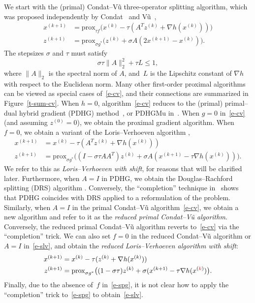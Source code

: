 \documentclass[letterpaper,11pt]{article}
\newcommand{\prox}{\mathrm{prox}}
\newcommand{\red}[1]{{\color{red}{#1}}}
\begin{document}
We start with the (primal) Condat--V\~u three-operator splitting 
algorithm, which was proposed independently
by Condat~\cite{Con:13} and V\~u~\cite{Vu:13},
\begin{subequations} \label{e-cv}
\begin{align}
  x^{(k+1)} &= \prox_{\tau f}
    \big(x^{(k)}-\tau (A^Tz^{(k)}+\nabla h(x^{(k)})) \big) \\
  z^{(k+1)} &= \prox_{\sigma g^\ast}
    \big(z^{(k)}+\sigma A(2x^{(k+1)}-x^{(k)}) \big).
\end{align}
\end{subequations}
The stepsizes $\sigma$ and $\tau$ must satisfy
\[
\sigma \tau \|A\|_2^2 + \tau L \leq 1,
\]
where $\|A\|_2$ is the spectral norm of $A$, and~$L$ is
the Lipschitz constant of $\nabla h$ with respect to the Euclidean norm.
Many other first-order proximal algorithms can be viewed as
special cases of~\eqref{e-cv},
and their connections are summarized in Figure~\ref{t-sum-cv}.
When $h=0$, algorithm~\eqref{e-cv} reduces to the (primal)
primal--dual hybrid gradient (PDHG) method~\cite{PCBC09,ChP:11,ChP:16},
or PDHGMu in~\cite{EZC:10}.
When $g=0$ in~\eqref{e-cv} (and assuming $z^{(0)}=0$),
we obtain the proximal gradient algorithm.
When $f=0$, we obtain a variant of the Loris--Verhoeven algorithm
\cite{LV11,CHZ13,DST15},
\begin{subequations} \label{e-slv}
\begin{align}
  x^{(k+1)} &= x^{(k)}-\tau (A^Tz^{(k)}+\nabla h(x^{(k)})) \\
  z^{(k+1)} &= \prox_{\sigma g^\ast}
    \big((I-\sigma \tau AA^T) z^{(k)}
    +\sigma A(x^{(k+1)}-\tau \nabla h(x^{(k)})) \big).
\end{align}
\end{subequations}
We refer to this as \emph{Loris--Verhoeven with shift},
for reasons that will be clarified later.
Furthermore, when $A=I$ in PDHG,
we obtain the Douglas--Rachford splitting (DRS) algorithm
\cite{LiM:79,EcB:92,CoP:07}.
Conversely, the ``completion'' technique in~\cite{OV20} shows that
PDHG coincides with DRS applied to a reformulation of the problem.
Similarly, when $A=I$ in the primal Condat--V\~u algorithm~\eqref{e-cv},
we obtain a new algorithm and refer to it as
the \emph{reduced primal Condat--V\~u algorithm}.
Conversely, the reduced primal Condat--V\~u algorithm
reverts to~\eqref{e-cv} via the ``completion'' trick.
We can also set $f=0$ in the reduced Condat--V\~u algorithm
or $A=I$ in~\eqref{e-slv},
and obtain the \emph{reduced Loris--Verhoeven algorithm with shift}:
\begin{subequations} \label{e-spg}
\begin{align}
  x^{(k+1)} &= x^{(k)}-\tau(z^{(k)}+\nabla h(x^{(k)})) \\
  z^{(k+1)} &= \prox_{\sigma g^\ast}
    \big( (1-\sigma\tau)z^{(k)}+\sigma(x^{(k+1)}
    -\tau \nabla
    h(x^{(\red{k})})\big).
\end{align}
\end{subequations}
Finally, due to the absence of~$f$ in~\eqref{e-spg},
it is not clear how to apply the ``completion'' trick to~\eqref{e-spg} 
to obtain~\eqref{e-slv}.
\end{document}
